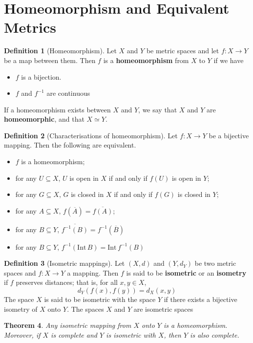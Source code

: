 \documentclass[10pt, oneside, reqno]{amsart}
\theoremstyle{plain}%
\newtheorem{thm}{Theorem}[section]
\theoremstyle{definition}
\newtheorem{defn}[thm]{Definition}
\theoremstyle{remark}
\newcommand{\met}{(X,d)}
\newcommand{\intr}{\text{Int}\,}
\newcommand{\ol}[1]{\overline{#1}}
\begin{document}
\section{Homeomorphism and Equivalent Metrics} %
\label{sec:homeomorphism_and_equivalent_metrics}
\begin{defn}[Homeomorphism]
	Let $X$ and $Y$ be metric spaces and let $f: X \rightarrow Y$ be a map between them.  Then $f$ is a \textbf{homeomorphism} from $X$ to $Y$ if we have \begin{itemize}
		\item $f$ is a bijection.
		\item $f$ and $f^{-1}$ are continuous
	\end{itemize}

	If a homeomorphism exists between $X$ and $Y$, we say that $X$ and $Y$ are \textbf{homeomorphic}, and that $X \simeq Y$.
\end{defn}

\begin{defn}[Characterisations of homeomorphism]
Let $f: X \rightarrow Y$ be a bijective mapping.  Then the following are equivalent.
\begin{itemize}
	\item $f$ is a homeomorphism;
	\item for any $U \subseteq X$, $U$ is open in $X$ if and only if $f(U)$ is open in $Y$;
	\item for any $G \subseteq X$, $G$ is closed in $X$ if and only if $f(G)$ is closed in $Y$;
	\item for any $A \subseteq X$, $f(\ol{A}) = \ol{f(A)}$;
	\item for any $B \subseteq Y$, $\ol{f^{-1}(B)} = f^{-1}(\ol{B})$
	\item for any $B \subseteq Y$, $f^{-1}(\intr B) = \intr f^{-1}(B)$
\end{itemize}
\end{defn}

\begin{defn}[Isometric mappings]
	Let $\met$ and $(Y, d_Y)$ be two metric spaces and $f: X \rightarrow Y$ a mapping.  Then $f$ is said to be \textbf{isometric} or an \textbf{isometry} if $f$ preserves distances; that is, for all $x,y \in X$, \[
		d_Y(f(x), f(y)) = d_X(x,y)
	\]
	The space $X$ is said to be isometric with the space $Y$ if there exists a bijective isometry of $X$ onto $Y$.  The spaces $X$ and $Y$ are isometric spaces
\end{defn}

\begin{thm}
	Any isometric mapping from $X$ onto $Y$ is a homeomorphism.  Moreover, if $X$ is complete and $Y$ is isometric with $X$, then $Y$ is also complete.
	\end{thm}
	
\end{document}
